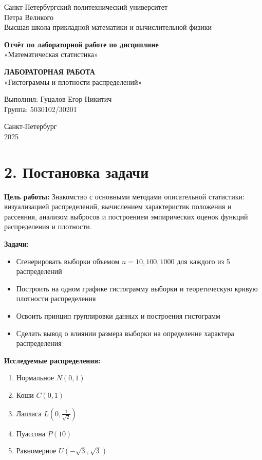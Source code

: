 \documentclass[a4paper,14pt]{extarticle}
\begin{document}
\begin{titlepage}
\begin{center}
\large
Санкт-Петербургский политехнический университет \\
Петра Великого \\
Высшая школа прикладной математики и вычислительной физики \\
\vspace{3cm}

\textbf{Отчёт по лабораторной работе по дисциплине} \\
«Математическая статистика» \\
\vspace{0.5cm}

\textbf{ЛАБОРАТОРНАЯ РАБОТА} \\
«Гистограммы и плотности распределений» \\
\vspace{2cm}

Выполнил: Гуцалов Егор Никитич \\
Группа: 5030102/30201 \\
\vfill

Санкт-Петербург \\
2025
\end{center}
\end{titlepage}

\section*{2. Постановка задачи}

\textbf{Цель работы:} Знакомство с основными методами описательной статистики: визуализацией распределений, вычислением характеристик положения и рассеяния, анализом выбросов и построением эмпирических оценок функций распределения и плотности.

\textbf{Задачи:}
\begin{itemize}
    \item Сгенерировать выборки объемом $n = 10, 100, 1000$ для каждого из 5 распределений
    \item Построить на одном графике гистограмму выборки и теоретическую кривую плотности распределения
    \item Освоить принцип группировки данных и построения гистограмм
    \item Сделать вывод о влиянии размера выборки на определение характера распределения
\end{itemize}

\textbf{Исследуемые распределения:}
\begin{enumerate}
    \item Нормальное $N(0, 1)$
    \item Коши $C(0, 1)$
    \item Лапласа $L(0, \frac{1}{\sqrt{2}})$
    \item Пуассона $P(10)$
    \item Равномерное $U(-\sqrt{3}, \sqrt{3})$
\end{enumerate}
\end{document}
